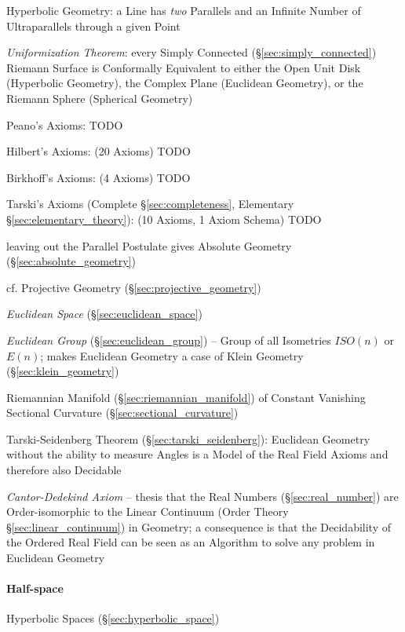 \fist Hyperbolic Geometry: a Line has \emph{two} Parallels and an Infinite
Number of Ultraparallels through a given Point

\emph{Uniformization Theorem}: every Simply Connected
(\S\ref{sec:simply_connected}) Riemann Surface is Conformally Equivalent to
either the Open Unit Disk (Hyperbolic Geometry), the Complex Plane (Euclidean
Geometry), or the Riemann Sphere (Spherical Geometry)

Peano's Axioms: TODO

Hilbert's Axioms: (20 Axioms) TODO

Birkhoff's Axioms: (4 Axioms) TODO

Tarski's Axioms (Complete \S\ref{sec:completeness}, Elementary
\S\ref{sec:elementary_theory}): (10 Axioms, 1 Axiom Schema) TODO

\fist leaving out the Parallel Postulate gives Absolute Geometry
(\S\ref{sec:absolute_geometry})

cf. Projective Geometry (\S\ref{sec:projective_geometry})

\emph{Euclidean Space} (\S\ref{sec:euclidean_space})

\emph{Euclidean Group} (\S\ref{sec:euclidean_group}) -- Group of all
Isometries $ISO(n)$ or $E(n)$; makes Euclidean Geometry a case of
Klein Geometry (\S\ref{sec:klein_geometry})

Riemannian Manifold (\S\ref{sec:riemannian_manifold}) of Constant Vanishing
Sectional Curvature (\S\ref{sec:sectional_curvature})

Tarski-Seidenberg Theorem (\S\ref{sec:tarski_seidenberg}): Euclidean Geometry
without the ability to measure Angles is a Model of the Real Field Axioms
and therefore also Decidable

\emph{Cantor-Dedekind Axiom} -- thesis that the Real Numbers
(\S\ref{sec:real_number}) are Order-isomorphic to the Linear Continuum (Order
Theory \S\ref{sec:linear_continuum}) in Geometry; a consequence is that the
Decidability of the Ordered Real Field can be seen as an Algorithm to solve any
problem in Euclidean Geometry



\paragraph{Half-space}\label{sec:half_space}\hfill

Hyperbolic Spaces (\S\ref{sec:hyperbolic_space})



